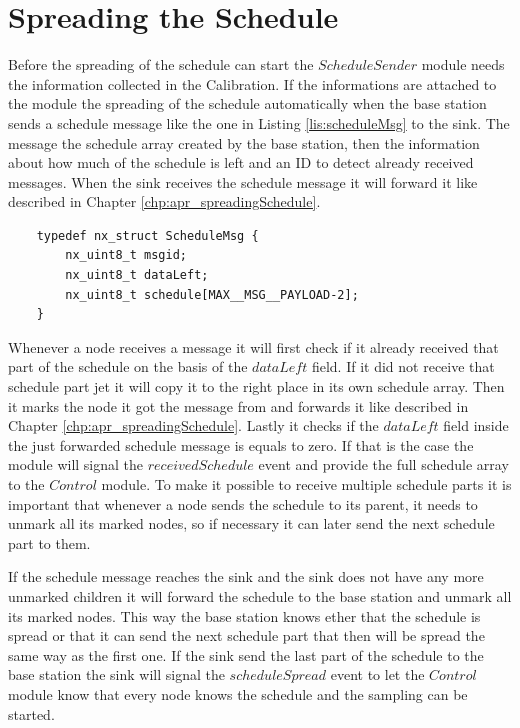 \section{Spreading the Schedule}
Before the spreading of the schedule can start the $ScheduleSender$ module needs the information collected in the Calibration. If the informations are attached to the module the spreading of the schedule automatically when the base station sends a schedule message like the one in  Listing \ref{lis:scheduleMsg} to the sink. The message the schedule array created by the base station, then the information about how much of the schedule is left and an ID to detect already received messages. When the sink receives the schedule message it will forward it like described in Chapter \ref{chp:apr_spreadingSchedule}.

\begin{lstlisting}
	typedef nx_struct ScheduleMsg {
		nx_uint8_t msgid;	
		nx_uint8_t dataLeft;
		nx_uint8_t schedule[MAX__MSG__PAYLOAD-2];
	}
\end{lstlisting}

Whenever a node receives a message it will first check if it already received that part of the schedule on the basis of the $dataLeft$ field. If it did not receive that schedule part jet it will copy it to the right place in its own schedule array. Then it marks the node it got the message from and forwards it like described in Chapter \ref{chp:apr_spreadingSchedule}. Lastly it checks if the $dataLeft$ field inside the just forwarded schedule message is equals to zero. If that is the case the module will signal the $receivedSchedule$ event and provide the full schedule array to the $Control$ module.
To make it possible to receive multiple schedule parts it is important that whenever a node sends the schedule to its parent, it needs to unmark all its marked nodes, so if necessary it can later send the next schedule part to them.

If the schedule message reaches the sink and the sink does not have any more unmarked children it will forward the schedule to the base station and unmark all its marked nodes. This way the base station knows ether that the schedule is spread or that it can send the next schedule part that then will be spread the same way as the first one. If the sink send the last part of the schedule to the base station the sink will signal the $scheduleSpread$ event to let the $Control$ module know that every node knows the schedule and the sampling can be started. 

